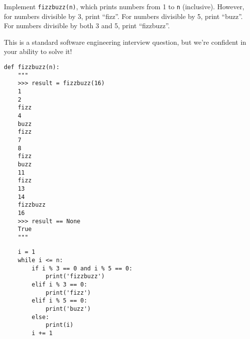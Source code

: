 \question Implement \lstinline$fizzbuzz(n)$, which prints numbers from 1
to \lstinline$n$ (inclusive). However, for numbers divisible by 3, print
``fizz''. For numbers divisible by 5, print ``buzz''. For numbers
divisible by both 3 and 5, print ``fizzbuzz''.

This is a standard software engineering interview question, but we're confident in your ability to solve it!

\begin{lstlisting}
def fizzbuzz(n):
    """
    >>> result = fizzbuzz(16)
    1
    2
    fizz
    4
    buzz
    fizz
    7
    8
    fizz
    buzz
    11
    fizz
    13
    14
    fizzbuzz
    16
    >>> result == None
    True
    """
\end{lstlisting}
\begin{solution}[2in]
\begin{lstlisting}
    i = 1
    while i <= n:
        if i % 3 == 0 and i % 5 == 0:
            print('fizzbuzz')
        elif i % 3 == 0:
            print('fizz')
        elif i % 5 == 0:
            print('buzz')
        else:
            print(i)
        i += 1
\end{lstlisting}
\end{solution}

